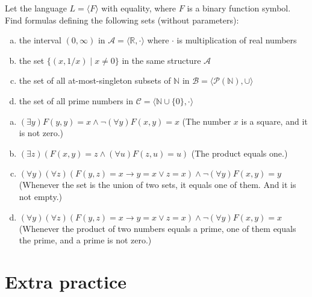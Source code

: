 \begin{problem}

    Let the language $L=\langle F \rangle$ with equality, where $F$ is a binary function symbol. Find formulas defining the following sets (without parameters):
    \begin{enumerate}[(a)]
        \item the interval $(0,\infty)$ in $\mathcal A=\langle\mathbb R, \cdot\rangle$ where $\cdot$ is multiplication of real numbers
        \item the set $\{(x, 1/x)\mid x\neq 0\}$ in the same structure $\mathcal A$
        \item the set of all at-most-singleton subsets of $\mathbb N$ in $\mathcal B=\langle\mathcal P(\mathbb N),\cup\rangle$
        \item the set of all prime numbers in $\mathcal C=\langle \mathbb N\cup\{0\}, \cdot\rangle$
    \end{enumerate}

    \begin{solution}

        \begin{enumerate}[(a)]
            \item $(\exists y)F(y,y)=x\land \neg (\forall y)F(x,y)=x$ (The number $x$ is a square, and it is not zero.)
            \item $(\exists z)(F(x,y)=z\land(\forall u)F(z,u)=u)$ (The product equals one.)
            \item $(\forall y)(\forall z)(F(y,z)=x\to y=x\lor z=x)\land\neg(\forall y)F(x,y)=y$ (Whenever the set is the union of two sets, it equals one of them. And it is not empty.)
            \item $(\forall y)(\forall z)(F(y,z)=x\to y=x\lor z=x)\land\neg(\forall y)F(x,y)=x$ (Whenever the product of two numbers equals a prime, one of them equals the prime, and a prime is not zero.)
        \end{enumerate}
                    
    \end{solution}

\end{problem}

        
        
\section*{Extra practice}


